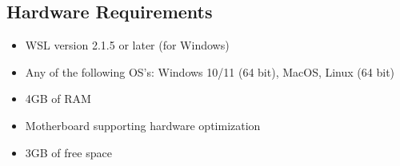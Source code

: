 \subsection*{Hardware Requirements}
\begin{itemize}
    \item WSL version 2.1.5 or later (for Windows)
    \item Any of the following OS's: Windows 10/11 (64 bit), MacOS, Linux (64 bit)
    \item 4GB of RAM
    \item Motherboard supporting hardware optimization
    \item 3GB of free space
\end{itemize}
